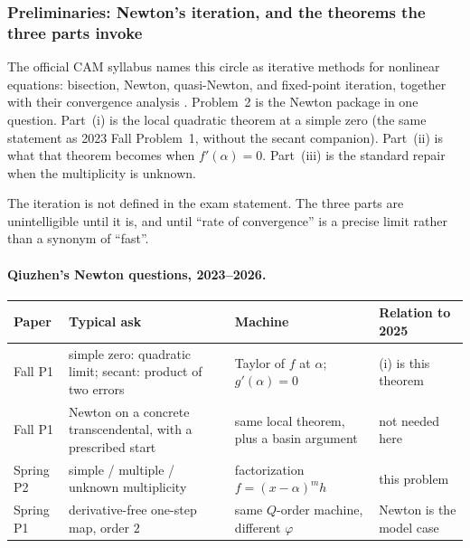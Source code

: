 \setcounter{section}{2}
\setcounter{theorem}{0}
\setcounter{definition}{0}
\setcounter{remark}{0}
\setcounter{note}{0}

\subsubsection{Preliminaries: Newton's iteration, and the theorems the three parts invoke}

The official CAM syllabus names this circle as iterative methods for nonlinear equations: bisection, Newton, quasi-Newton, and fixed-point iteration, together with their convergence analysis \cite{conte00}. Problem~2 is the Newton package in one question. Part~(i) is the local quadratic theorem at a simple zero (the same statement as 2023 Fall Problem~1, without the secant companion). Part~(ii) is what that theorem becomes when \(f'(\alpha)=0\). Part~(iii) is the standard repair when the multiplicity is unknown.

The iteration is not defined in the exam statement. The three parts are unintelligible until it is, and until ``rate of convergence'' is a precise limit rather than a synonym of ``fast''.

\paragraph{Qiuzhen's Newton questions, 2023--2026.}

{\footnotesize
\begin{center}
\begin{tabular}{@{}>{\raggedright\arraybackslash}p{2.45cm}
                   >{\raggedright\arraybackslash}p{4.35cm}
                   >{\raggedright\arraybackslash}p{3.45cm}
                   >{\raggedright\arraybackslash}p{3.55cm}@{}}
\toprule
Paper & Typical ask & Machine & Relation to 2025 \\
\midrule
2023 Fall P1 & simple zero: quadratic limit; secant: product of two errors & Taylor of \(f\) at \(\alpha\); \(g'(\alpha)=0\) & (i) is this theorem \\
2024 Fall P1 & Newton on a concrete transcendental, with a prescribed start & same local theorem, plus a basin argument & not needed here \\
2025 Spring P2 & simple / multiple / unknown multiplicity & factorization \(f=(x-\alpha)^m h\) & this problem \\
2026 Spring P1 & derivative-free one-step map, order \(2\) & same \(Q\)-order machine, different \(\varphi\) & Newton is the model case \\
\bottomrule
\end{tabular}
\end{center}
}

